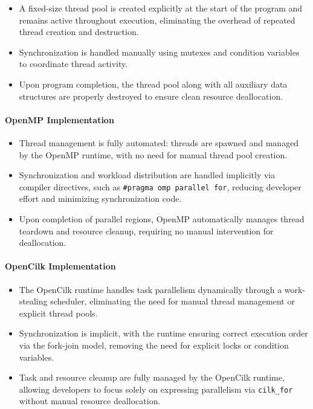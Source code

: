\documentclass{article}
\begin{document}
\begin{itemize}
    \item A fixed-size thread pool is created explicitly at the start of the program and remains active 
    throughout execution, eliminating the overhead of repeated thread creation and destruction.
    \item Synchronization is handled manually using mutexes and condition variables to coordinate thread activity.
    \item Upon program completion, the thread pool along with all auxiliary data structures are properly destroyed 
    to ensure clean resource deallocation.
\end{itemize}

\paragraph{OpenMP Implementation}

\begin{itemize}
    \item Thread management is fully automated: threads are spawned and managed by the OpenMP runtime, 
    with no need for manual thread pool creation.
    \item Synchronization and workload distribution are handled implicitly via compiler directives, such as 
    \texttt{\#pragma omp parallel for}, reducing developer effort and minimizing synchronization code.
    \item Upon completion of parallel regions, OpenMP automatically manages thread teardown and resource 
    cleanup, requiring no manual intervention for deallocation.
\end{itemize}


\paragraph{OpenCilk Implementation}

\begin{itemize}
    \item The OpenCilk runtime handles task parallelism dynamically through a work-stealing scheduler, 
    eliminating the need for manual thread management or explicit thread pools.
    \item Synchronization is implicit, with the runtime ensuring correct execution order via the fork-join 
    model, removing the need for explicit locks or condition variables.
    \item Task and resource cleanup are fully managed by the OpenCilk runtime, allowing developers to focus 
    solely on expressing parallelism via \texttt{cilk\_for} without manual resource deallocation.
\end{itemize}
\end{document}
